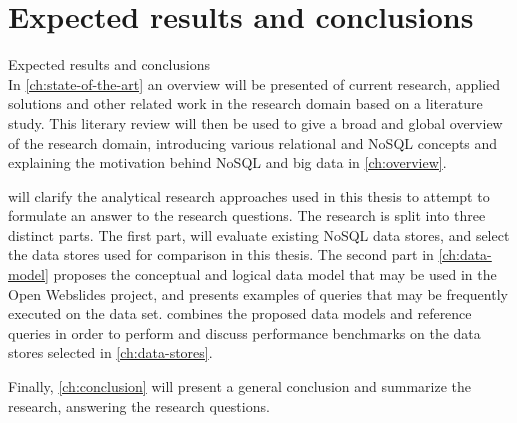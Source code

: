 \section{Expected results and conclusions}
\label{sec:expected-results-and-conclusions}


Expected results and conclusions\\

In \cref{ch:state-of-the-art} an overview will be presented of current research, applied solutions and other related work in the research domain based on a literature study. This literary review will then be used to give a broad and global overview of the research domain, introducing various relational and NoSQL concepts and explaining the motivation behind NoSQL and big data in \cref{ch:overview}.

 will clarify the analytical research approaches used in this thesis to attempt to formulate an answer to the research questions. The research is split into three distinct parts. The first part,  will evaluate existing NoSQL data stores, and select the data stores used for comparison in this thesis. The second part in \cref{ch:data-model} proposes the conceptual and logical data model that may be used in the Open Webslides project, and presents examples of queries that may be frequently executed on the data set.
 combines the proposed data models and reference queries in order to perform and discuss performance benchmarks on the data stores selected in \cref{ch:data-stores}.

Finally, \cref{ch:conclusion} will present a general conclusion and summarize the research, answering the research questions.
